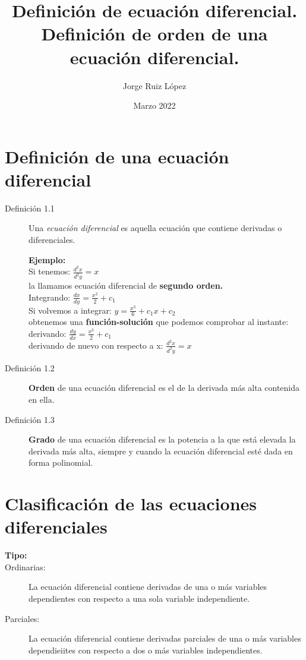 \documentclass{article}
\title{Definición de ecuación diferencial. Definición de orden de una ecuación diferencial.}
\author{Jorge Ruiz López}
\affil{Facultad de Ingeniería UNAM}
\date{Marzo 2022}
\begin{document}
\maketitle

\section{Definición de una ecuación diferencial}
\begin{description}
    \item[Definición 1.1]Una \emph{ecuación diferencial} \cite{carmona} es aquella ecuación que contiene derivadas o diferenciales.
     \begin{center}\textbf{Ejemplo:}\\
    Si tenemos: \quad $\frac{d^2x}{d^2y} = x$\\
    la llamamos ecuación diferencial de \textbf{segundo orden.}\\
    Integrando: \quad  $\frac{dx}{dy} = \frac{x^2}{2}+c_1$\\
    Si volvemos a integrar: $y=\frac{x^3}{6}+c_1x+c_2$\\
    obtenemos una \textbf{función-solución} que podemos comprobar al instante:\\
    derivando: $\frac{dy}{dx} = \frac{x^3}{2} +c_1$\\
    derivando de nuevo con respecto a x: $\frac{d^2x}{d^2y} = x$
    \end{center}
    \item[Definición 1.2]\textbf{Orden} de una ecuación diferencial es el de la derivada más alta contenida en ella.
    \item[Definición 1.3]\textbf{Grado} de una ecuación diferencial es la potencia a la que está elevada la derivada más alta, siempre y cuando la ecuación diferencial esté dada en forma polinomial. 
\end{description}

\section{Clasificación de las ecuaciones diferenciales}
\begin{description}
\item[\textbf{Tipo:}]
    \item[Ordinarias:]La ecuación diferencial contiene derivadas de una o más variables dependientes con respecto a una sola variable independiente.
     \item[Parciales:]La ecuación diferencial contiene derivadas parciales de una o más variables dependieiites con respecto a dos o más variables independientes. 
\end{description}
\end{document}
